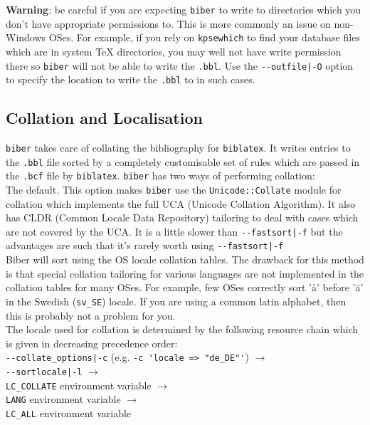 \documentclass{ltxdockit}
\def\biberex#1{\hbox{\hspace{-4em}\texttt{\small \detokenize{#1}}}}
\begin{document}
\noindent \textbf{Warning}: be careful if you are expecting \verb+biber+ to
write to directories which you don't have appropriate permissions to. This
is more commonly an issue on non-Windows OSes. For example, if you rely on
\verb+kpsewhich+ to find your database files which are in system TeX
directories, you may well not have write permission there so \verb+biber+
will not be able to write the \verb+.bbl+. Use the \verb+--outfile|-O+
option to specify the location to write the \verb+.bbl+ to in such cases.

\subsection{Collation and Localisation}\label{coll}

\verb+biber+ takes care of collating the bibliography for
\verb+biblatex+. It writes entries to the \verb+.bbl+ file sorted by a
completely customisable set of rules which are passed in the
\verb+.bcf+ file by \verb+biblatex+. \verb+biber+ has two ways of performing
collation:\\[2ex]

\biberex{--collate|-C}
  \noindent The default. This option makes \verb+biber+ use the
  \verb+Unicode::Collate+ module for collation which implements the full UCA (Unicode
  Collation Algorithm). It also has CLDR (Common Locale Data
  Repository) tailoring to deal with cases which are not covered by the
  UCA. It is a little slower than \verb+--fastsort|-f+ but the
  advantages are such that it's rarely worth using \verb+--fastsort|-f+\\[1ex]

\biberex{--fastsort|-f}
  \noindent Biber will sort using
  the OS locale collation tables. The drawback for this method is that special
  collation tailoring for various languages are not implemented in the
  collation tables for many OSes. For example, few OSes correctly sort 'å'
  before 'ä' in the Swedish (\verb+sv_SE+) locale. If you are using a
  common latin alphabet, then this is probably not a problem for you.\\[2ex]

\noindent The locale used for collation is determined by the following resource
chain which is given in decreasing precedence order:\\[2ex]

\noindent\verb+--collate_options|-c+ (e.g. \verb+-c 'locale => "de_DE"'+) $\rightarrow$\\
\hspace*{1em}\verb+--sortlocale|-l+ $\rightarrow$\\
\hspace*{2em}\verb+LC_COLLATE+ environment variable $\rightarrow$\\
\hspace*{3em}\verb+LANG+ environment variable $\rightarrow$\\
\hspace*{4em}\verb+LC_ALL+ environment variable\\[2ex]
\end{document}
